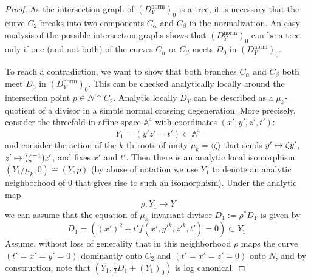 \documentclass[JEP,XML,SOM,Unicode,NoFloatCountersInSection,published]{cedram}
\newcommand\mto{\mathchoice{\longmapsto}{\mapsto}{\mapsto}{\mapsto}}
\theoremstyle{plain}
\theoremstyle{definition}
\renewcommand\AA{{\mathbb A}}
\newcommand\norm{{\mathrm{norm}}}
\newcommand\cl{{\colon}}
\begin{document}
\begin{proof}
As the intersection graph of $(D^\norm_Y)_0$ is a tree, it is necessary that the curve $C_2$ breaks into two components $C_\alpha$ and $C_\beta$ in the normalization. An easy analysis of the possible intersection graphs shows that $(D^\norm_Y)_0$ can be a tree only if one (and not both) of the curves $C_\alpha$ or $C_\beta$ meets $D_0$ in $(D^\norm_Y)_0$.

To reach a contradiction, we want to show that both branches $C_\alpha$ and $C_\beta$ both meet $D_0$ in $(D^\norm_Y)_0$. This can be checked analytically locally around the intersection point $p\in N\cap C_2$. Analytic locally $D_Y$ can be described as a $\mu_k$-quotient of a divisor in a simple normal crossing degeneration. More precisely, consider the threefold in affine space $\AA^4$ with coordinates $(x',y',z',t')$:
\[
Y_1=(y'z'=t')\subset \AA^4
\]
and consider the action of the $k$-th roots of unity $\mu_k=\langle \zeta \rangle$ that sends $y'
\mto \zeta y'$, $z'\mto (\zeta^{-1}) z'$, and fixes $x'$ and $t'$. Then there is an analytic local isomorphism $(Y_1/\mu_k,0)\cong (Y,p)$ (by abuse of notation we use $Y_1$ to denote an analytic neighborhood of $0$ that gives rise to such an isomorphism). Under the analytic map
\[
\rho\cl Y_1\to Y
\]
we can assume that the equation of $\mu_k$-invariant divisor $D_1:=\rho^*D_Y$ is given by
\[
D_1 = \left((x')^2+t'f(x',y'^k,z'^k,t')=0\right)\subset Y_1.
\]
Assume, without loss of generality that in this neighborhood $\rho$ maps the curve $(t'=x'=y'=0)$ dominantly onto $C_2$ and $(t'=x'=z'=0)$ onto $N$, and by construction, note that $(Y_1, \frac{1}{2}D_1 + (Y_1)_0)$ is log canonical.


\end{proof}
\end{document}
